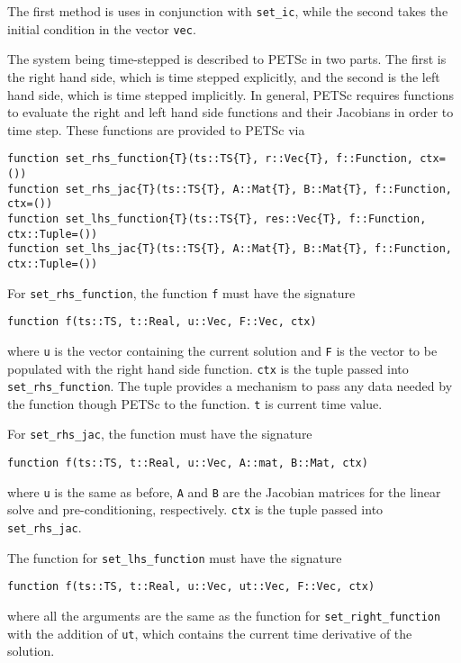 \documentclass{article}
\begin{document}
The first method is uses in conjunction with \texttt{set\_ic}, while the 
second takes the initial condition in the vector \texttt{vec}.

The system being time-stepped is described to PETSc in two parts.  The first is 
the right hand side, which is time stepped explicitly, and the second is the 
left hand side, which is time stepped implicitly.  In general, PETSc requires 
functions to evaluate the right and left hand side functions and their 
Jacobians  in order to time step.  These functions are provided to PETSc via

\begin{verbatim}
function set_rhs_function{T}(ts::TS{T}, r::Vec{T}, f::Function, ctx=())
function set_rhs_jac{T}(ts::TS{T}, A::Mat{T}, B::Mat{T}, f::Function, ctx=())
function set_lhs_function{T}(ts::TS{T}, res::Vec{T}, f::Function, ctx::Tuple=())
function set_lhs_jac{T}(ts::TS{T}, A::Mat{T}, B::Mat{T}, f::Function, ctx::Tuple=())
\end{verbatim}
For \texttt{set\_rhs\_function}, the function \texttt{f} must have the 
signature

\begin{verbatim}
function f(ts::TS, t::Real, u::Vec, F::Vec, ctx)
\end{verbatim}

where \texttt{u} is the vector containing the current solution and \texttt{F}
is the vector to be populated with the right hand side function.  \texttt{ctx}
is the tuple passed into \texttt{set\_rhs\_function}.  The tuple provides a 
mechanism to pass any data needed by the function though PETSc to the function.
\texttt{t} is current time value.

For \texttt{set\_rhs\_jac}, the function must have the signature

\begin{verbatim}
function f(ts::TS, t::Real, u::Vec, A::mat, B::Mat, ctx)
\end{verbatim}

where \texttt{u} is the same as before, \texttt{A} and \texttt{B} are the 
Jacobian matrices for the linear solve and pre-conditioning, respectively.  
\texttt{ctx} is the tuple passed into \texttt{set\_rhs\_jac}.

The function for \texttt{set\_lhs\_function} must have the signature

\begin{verbatim}
function f(ts::TS, t::Real, u::Vec, ut::Vec, F::Vec, ctx)
\end{verbatim}
where all the arguments are the same as the function for 
\texttt{set\_right\_function} with the addition of \texttt{ut}, which contains
the current time derivative of the solution.
\end{document}
